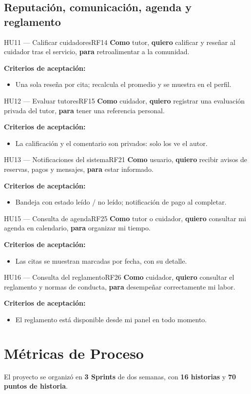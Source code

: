 \documentclass[11pt,a4paper]{article}
\newcommand{\rqp}[3]{%
  \textbf{Como} #1, \textbf{quiero} #2, \textbf{para} #3.\par\vspace{4pt}
  \textbf{\color{guindaDark}Criterios de aceptación:}}
\begin{document}
\subsection{Reputación, comunicación, agenda y reglamento}
\begin{hu}{HU11 — Calificar cuidadores}{RF14}
\rqp{tutor}{calificar y reseñar al cuidador tras el servicio}{retroalimentar a la comunidad}
\begin{itemize}
  \item Una sola reseña por cita; recalcula el promedio y se muestra en el perfil.
\end{itemize}
\end{hu}
\begin{hu}{HU12 — Evaluar tutores}{RF15}
\rqp{cuidador}{registrar una evaluación privada del tutor}{tener una referencia personal}
\begin{itemize}
  \item La calificación y el comentario son privados: solo los ve el autor.
\end{itemize}
\end{hu}
\begin{hu}{HU13 — Notificaciones del sistema}{RF21}
\rqp{usuario}{recibir avisos de reservas, pagos y mensajes}{estar informado}
\begin{itemize}
  \item Bandeja con estado leído / no leído; notificación de pago al completar.
\end{itemize}
\end{hu}
\begin{hu}{HU15 — Consulta de agenda}{RF25}
\rqp{tutor o cuidador}{consultar mi agenda en calendario}{organizar mi tiempo}
\begin{itemize}
  \item Las citas se muestran marcadas por fecha, con su detalle.
\end{itemize}
\end{hu}
\begin{hu}{HU16 — Consulta del reglamento}{RF26}
\rqp{cuidador}{consultar el reglamento y normas de conducta}{desempeñar correctamente mi labor}
\begin{itemize}
  \item El reglamento está disponible desde mi panel en todo momento.
\end{itemize}
\end{hu}

\section{Métricas de Proceso}
El proyecto se organizó en \textbf{3 Sprints} de dos semanas, con \textbf{16
historias} y \textbf{70 puntos de historia}.
\end{document}
